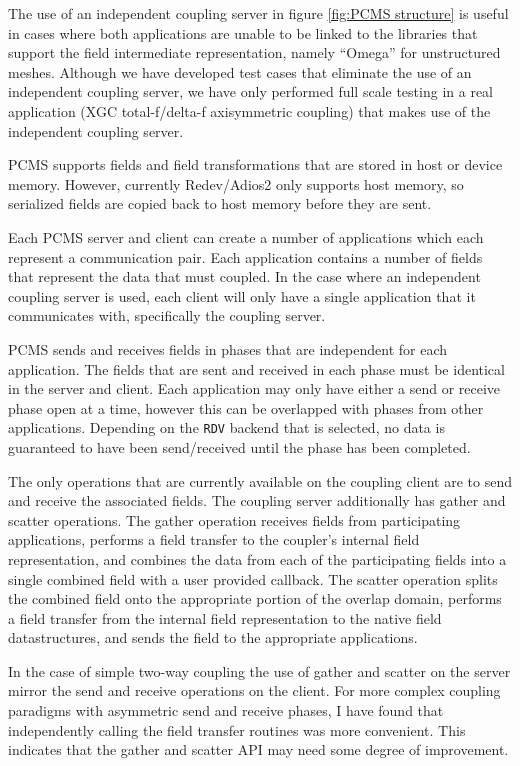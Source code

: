 \documentclass[12pt]{article}
\begin{document}
The use of an independent coupling server in figure \ref{fig:PCMS structure} is useful in cases where both applications are unable to be linked to the libraries that support the field intermediate representation, namely ``Omega'' for unstructured meshes. Although we have developed test cases that eliminate the use of an independent coupling server, we have only performed full scale testing in a real application (XGC total-f/delta-f axisymmetric coupling) that makes use of the independent coupling server. 

PCMS supports fields and field transformations that are stored in host or device memory. However, currently Redev/Adios2 only supports host memory, so serialized fields are copied back to host memory before they are sent.

Each PCMS server and client can create a number of applications which each represent a communication pair. Each application contains a number of fields that represent the data that must coupled. In the case where an independent coupling server is used, each client will only have a single application that it communicates with, specifically the coupling server.

PCMS sends and receives fields in phases that are independent for each application. The fields that are sent and received in each phase must be identical in the server and client. Each application may only have either a send or receive phase open at a time, however this can be overlapped with phases from other applications. Depending on the \texttt{RDV} backend that is selected, no data is guaranteed to have been send/received until the phase has been completed.

The only operations that are currently available on the coupling client are to send and receive the associated fields. The coupling server additionally has gather and scatter operations. The gather operation receives fields from participating applications, performs a field transfer to the coupler's internal field representation, and combines the data from each of the participating fields into a single combined field with a user provided callback. The scatter operation splits the combined field onto the appropriate portion of the overlap domain, performs a field transfer from the internal field representation to the native field datastructures, and sends the field to the appropriate applications.

In the case of simple two-way coupling the use of gather and scatter on the server mirror the send and receive operations on the client. For more complex coupling paradigms with asymmetric send and receive phases, I have found that independently calling the field transfer routines was more convenient. This indicates that the gather and scatter API may need some degree of improvement.
\end{document}
